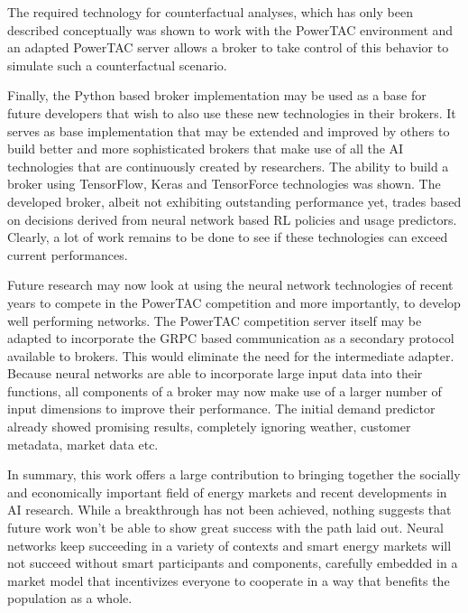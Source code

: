 The required technology for counterfactual analyses, which has only been described conceptually was shown to work with
the \ac{PowerTAC} environment and an adapted \ac{PowerTAC} server allows a broker to take control of this behavior to
simulate such a counterfactual scenario.

Finally, the Python based broker implementation may be used as a base for future developers that wish to also use these
new technologies in their brokers. It serves as base implementation that may be extended and improved by others to build
better and more sophisticated brokers that make use of all the \ac{AI} technologies that are continuously created by
researchers. The ability to build a broker using TensorFlow, Keras and TensorForce technologies was shown. The
developed broker, albeit not exhibiting outstanding performance yet, trades based on decisions derived from neural network based \ac{RL}
policies and usage predictors. Clearly, a lot of work remains to be done to see if these technologies can exceed current
performances.


Future research may now look at using the neural network technologies of recent years to compete in the \ac{PowerTAC}
competition and more importantly, to develop well performing networks. The \ac{PowerTAC} competition server itself may
be adapted to incorporate the \ac{GRPC} based communication as a secondary protocol available to brokers. This would
eliminate the need for the intermediate adapter. Because neural networks are able to incorporate large input data into
their functions, all components of a broker may now make use of a larger number of input dimensions to improve their
performance. The initial demand predictor already showed promising results, completely ignoring weather, customer
metadata, market data etc.

In summary, this work offers a large contribution to bringing together the socially and economically important field of
energy markets and recent developments in \ac{AI} research. While a breakthrough has not been achieved, nothing suggests
that future work won't be able to show great success with the path laid out. Neural networks keep succeeding in a variety of
contexts and smart energy markets will not succeed without smart participants and components, carefully embedded in a
market model that incentivizes everyone to cooperate in a way that benefits the population as a whole.
